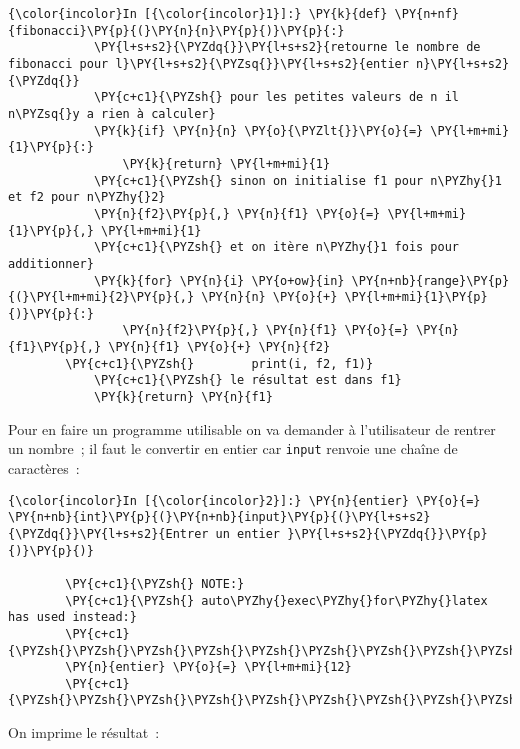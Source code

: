     \begin{Verbatim}[commandchars=\\\{\},frame=single,framerule=0.3mm,rulecolor=\color{cellframecolor}]
{\color{incolor}In [{\color{incolor}1}]:} \PY{k}{def} \PY{n+nf}{fibonacci}\PY{p}{(}\PY{n}{n}\PY{p}{)}\PY{p}{:}
            \PY{l+s+s2}{\PYZdq{}}\PY{l+s+s2}{retourne le nombre de fibonacci pour l}\PY{l+s+s2}{\PYZsq{}}\PY{l+s+s2}{entier n}\PY{l+s+s2}{\PYZdq{}}
            \PY{c+c1}{\PYZsh{} pour les petites valeurs de n il n\PYZsq{}y a rien à calculer}
            \PY{k}{if} \PY{n}{n} \PY{o}{\PYZlt{}}\PY{o}{=} \PY{l+m+mi}{1}\PY{p}{:}
                \PY{k}{return} \PY{l+m+mi}{1}
            \PY{c+c1}{\PYZsh{} sinon on initialise f1 pour n\PYZhy{}1 et f2 pour n\PYZhy{}2}
            \PY{n}{f2}\PY{p}{,} \PY{n}{f1} \PY{o}{=} \PY{l+m+mi}{1}\PY{p}{,} \PY{l+m+mi}{1}
            \PY{c+c1}{\PYZsh{} et on itère n\PYZhy{}1 fois pour additionner}
            \PY{k}{for} \PY{n}{i} \PY{o+ow}{in} \PY{n+nb}{range}\PY{p}{(}\PY{l+m+mi}{2}\PY{p}{,} \PY{n}{n} \PY{o}{+} \PY{l+m+mi}{1}\PY{p}{)}\PY{p}{:}
                \PY{n}{f2}\PY{p}{,} \PY{n}{f1} \PY{o}{=} \PY{n}{f1}\PY{p}{,} \PY{n}{f1} \PY{o}{+} \PY{n}{f2}
        \PY{c+c1}{\PYZsh{}        print(i, f2, f1)}
            \PY{c+c1}{\PYZsh{} le résultat est dans f1}
            \PY{k}{return} \PY{n}{f1}
\end{Verbatim}


    Pour en faire un programme utilisable on va demander à l'utilisateur de
rentrer un nombre~; il faut le convertir en entier car \texttt{input}
renvoie une chaîne de caractères~:

    \begin{Verbatim}[commandchars=\\\{\},frame=single,framerule=0.3mm,rulecolor=\color{cellframecolor}]
{\color{incolor}In [{\color{incolor}2}]:} \PY{n}{entier} \PY{o}{=} \PY{n+nb}{int}\PY{p}{(}\PY{n+nb}{input}\PY{p}{(}\PY{l+s+s2}{\PYZdq{}}\PY{l+s+s2}{Entrer un entier }\PY{l+s+s2}{\PYZdq{}}\PY{p}{)}\PY{p}{)}
        
        \PY{c+c1}{\PYZsh{} NOTE:}
        \PY{c+c1}{\PYZsh{} auto\PYZhy{}exec\PYZhy{}for\PYZhy{}latex has used instead:}
        \PY{c+c1}{\PYZsh{}\PYZsh{}\PYZsh{}\PYZsh{}\PYZsh{}\PYZsh{}\PYZsh{}\PYZsh{}\PYZsh{}\PYZsh{}}
        \PY{n}{entier} \PY{o}{=} \PY{l+m+mi}{12}
        \PY{c+c1}{\PYZsh{}\PYZsh{}\PYZsh{}\PYZsh{}\PYZsh{}\PYZsh{}\PYZsh{}\PYZsh{}\PYZsh{}\PYZsh{}}
\end{Verbatim}


    On imprime le résultat~:

